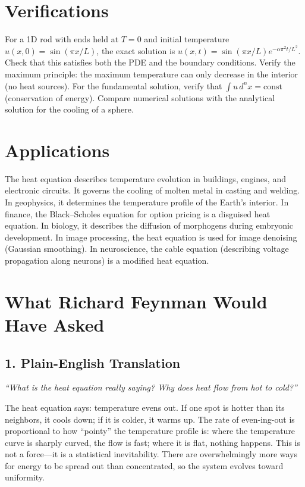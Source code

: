 \documentclass[11pt,openright]{book}
\begin{document}
\section*{Verifications}

For a 1D rod with ends held at $T = 0$ and initial temperature $u(x, 0) = \sin(\pi x/L)$, the exact solution is $u(x, t) = \sin(\pi x/L)e^{-\alpha\pi^2 t/L^2}$. Check that this satisfies both the PDE and the boundary conditions. Verify the maximum principle: the maximum temperature can only decrease in the interior (no heat sources). For the fundamental solution, verify that $\int u\,d^nx = \text{const}$ (conservation of energy). Compare numerical solutions with the analytical solution for the cooling of a sphere.
\section*{Applications}

The heat equation describes temperature evolution in buildings, engines, and electronic circuits. It governs the cooling of molten metal in casting and welding. In geophysics, it determines the temperature profile of the Earth's interior. In finance, the Black--Scholes equation for option pricing is a disguised heat equation. In biology, it describes the diffusion of morphogens during embryonic development. In image processing, the heat equation is used for image denoising (Gaussian smoothing). In neuroscience, the cable equation (describing voltage propagation along neurons) is a modified heat equation.
\section*{What Richard Feynman Would Have Asked}

\subsection*{1. Plain-English Translation}
\textit{``What is the heat equation really saying? Why does heat flow from hot to cold?''}

The heat equation says: temperature evens out. If one spot is hotter than its neighbors, it cools down; if it is colder, it warms up. The rate of even-ing-out is proportional to how ``pointy'' the temperature profile is: where the temperature curve is sharply curved, the flow is fast; where it is flat, nothing happens. This is not a force---it is a statistical inevitability. There are overwhelmingly more ways for energy to be spread out than concentrated, so the system evolves toward uniformity.
\end{document}
